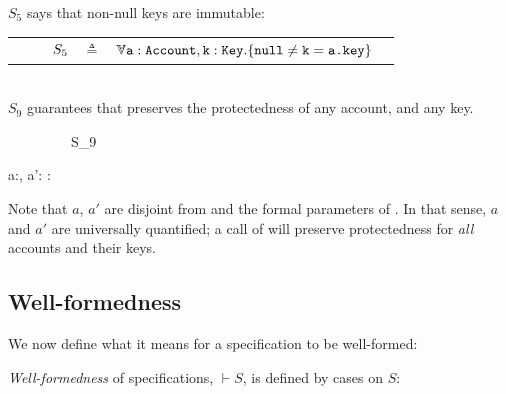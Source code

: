 {
 \begin{example}
 \label{example:twostate}
 \label{example:mprepostl}
 $S_5$  says %
  that   non-null keys are immutable:
 \\
 \begin{tabular}{lcll}
$\strut \ \ \ \ \ \ \ \ S_5$ & $\triangleq$   & ${\TwoStatesN {\prg{a}:\prg{Account},\prg{k}:\prg{Key}}  {\prg{null}\neq \prg{k}=\prg{a.\password}}} $  \end{tabular}
\\
%
%
% 
$S_9$    guarantees that  preserves the protectedness of any account, and any key.  \\
   {\sprepost
		{\strut \ \ \ \ \ \ \ \ \ S_9} 
		{  a:, a':\wedge  {}\wedge  {} }
		{} {} {:}
		{   \wedge  {}  }
		{   \wedge  {} }
}

\noindent
Note that  $a$, $a'$ are disjoint from  and the formal parameters of . 
In that sense, $a$ and $a'$ are universally quantified; a call of  will preserve protectedness for \emph{ all} accounts and their keys. 

\end{example}

\subsection{\textbf{Well-formedness}} We now define what it means for a specification to be well-formed:

\begin{definition}%
 {\emph{Well-formedness}} of specifications,  $\vdash S$,  is   defined by cases on $S$:
\label{f:holistic-wff}


\end{definition}}
